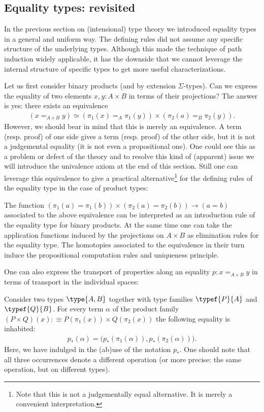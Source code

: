 \subsection{Equality types: revisited}

    In the previous section on (intensional) type theory we introduced equality types in a general and uniform way. The defining rules did not assume any specific structure of the underlying types. Although this made the technique of path induction widely applicable, it has the downside that we cannot leverage the internal structure of specific types to get more useful characterizations.

    Let us first consider binary products (and by extension $\Sigma$-types). Can we express the equality of two elements $x,y:A\times B$ in terms of their projections? The answer is yes: there exists an equivalence
    \begin{gather}
        (x=_{A\times B}y)\simeq(\pi_1(x)=_A\pi_1(y))\times(\pi_2(a)=_B\pi_2(y)).
    \end{gather}
    However, we should bear in mind that this is merely an equivalence. A term (resp. proof) of one side gives a term (resp. proof) of the other side, but it is not a judgemental equality (it is not even a propositional one). One could see this as a problem or defect of the theory and to resolve this kind of (apparent) issue we will introduce the univalence axiom at the end of this section. Still one can leverage this equivalence to give a practical alternative\footnote{Note that this is not a judgementally equal alternative. It is merely a convenient interpretation.} for the defining rules of the equality type in the case of product types:
    \begin{remark}
        The function $(\pi_1(a)=\pi_1(b))\times(\pi_2(a)=\pi_2(b))\rightarrow(a=b)$ associated to the above equivalence can be interpreted as an introduction rule of the equality type for binary products. At the same time one can take the application functions induced by the projections on $A\times B$ as elimination rules for the equality type. The homotopies associated to the equivalence in their turn induce the propositional computation rules and uniqueness principle.
    \end{remark}

    One can also express the transport of properties along an equality $p:x=_{A\times B}y$ in terms of transport in the individual spaces:
    \begin{property}
        Consider two types $\type{A, B}$ together with type families $\typef{P}{A}$ and $\typef{Q}{B}$. For every term $\alpha$ of the product family $(P\times Q)(x):\equiv P(\pi_1(x))\times Q(\pi_2(x))$ the following equality is inhabited:
        \begin{gather}
            p_*(\alpha) = \big(p_*(\pi_1(\alpha)), p_*(\pi_2(\alpha))\big).
        \end{gather}
        Here, we have indulged in the (ab)use of the notation $p_*$. One should note that all three occurrences denote a different operation (or more precise: the same operation, but on different types).
    \end{property}

